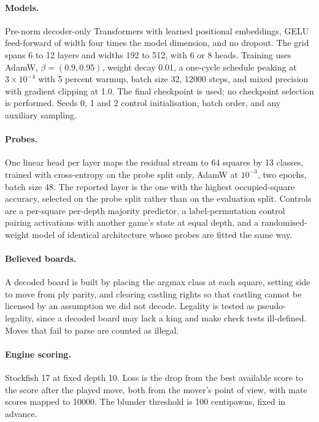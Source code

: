 \paragraph{Models.} Pre-norm decoder-only Transformers with learned positional
embeddings, GELU feed-forward of width four times the model dimension, and no
dropout. The grid spans 6 to 12 layers and widths 192 to 512, with 6 or 8 heads.
Training uses AdamW, $\beta = (0.9, 0.95)$, weight decay 0.01, a one-cycle
schedule peaking at $3\times10^{-4}$ with 5 percent warmup, batch size 32, 12000
steps, and mixed precision with gradient clipping at 1.0. The final checkpoint is
used; no checkpoint selection is performed. Seeds 0, 1 and 2 control
initialisation, batch order, and any auxiliary sampling.

\paragraph{Probes.} One linear head per layer maps the residual stream to 64
squares by 13 classes, trained with cross-entropy on the probe split only, AdamW
at $10^{-3}$, two epochs, batch size 48. The reported layer is the one with the
highest occupied-square accuracy, selected on the probe split rather than on the
evaluation split. Controls are a per-square per-depth majority predictor, a
label-permutation control pairing activations with another game's state at equal
depth, and a randomised-weight model of identical architecture whose probes are
fitted the same way.

\paragraph{Believed boards.} A decoded board is built by placing the argmax class
at each square, setting side to move from ply parity, and clearing castling
rights so that castling cannot be licensed by an assumption we did not decode.
Legality is tested as pseudo-legality, since a decoded board may lack a king and
make check tests ill-defined. Moves that fail to parse are counted as illegal.

\paragraph{Engine scoring.} Stockfish 17 at fixed depth 10. Loss is the drop from
the best available score to the score after the played move, both from the
mover's point of view, with mate scores mapped to 10000. The blunder threshold is
100 centipawns, fixed in advance.

